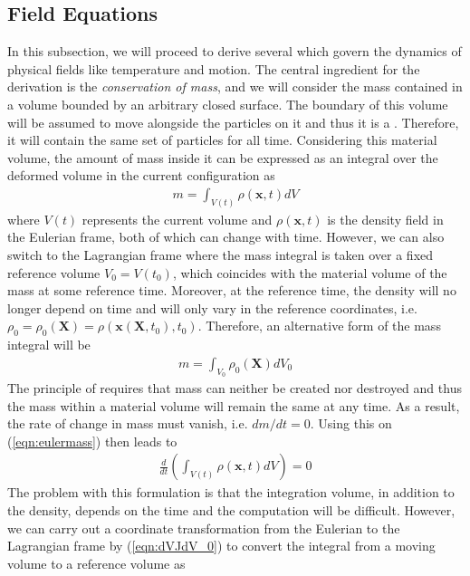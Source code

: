 \subsection{Field Equations}
In this subsection, we will proceed to derive several  which govern the dynamics of physical fields like temperature and motion. The central ingredient for the derivation is the \textit{conservation of mass}, and we will consider the mass contained in a volume bounded by an arbitrary closed surface. The boundary of this volume will be assumed to move alongside the particles on it and thus it is a . Therefore, it will contain the same set of particles for all time. Considering this material volume, the amount of mass inside it can be expressed as an integral over the deformed volume in the current configuration as
\begin{align}
m = \int_{V(t)} \rho(\textbf{x},t) dV \label{eqn:eulermass}
\end{align}
where $V(t)$ represents the current volume and $\rho(\textbf{x},t)$ is the density field in the Eulerian frame, both of which can change with time. However, we can also switch to the Lagrangian frame where the mass integral is taken over a fixed reference volume $V_0 = V(t_0)$, which coincides with the material volume of the mass at some reference time. Moreover, at the reference time, the density will no longer depend on time and will only vary in the reference coordinates, i.e.\ $\rho_0 = \rho_0(\textbf{X}) = \rho(\textbf{x}(\textbf{X},t_0), t_0)$. Therefore, an alternative form of the mass integral will be
\begin{align}
m = \int_{V_0} \rho_0(\textbf{X}) dV_0 \label{eqn:lagmass}
\end{align}
The principle of  requires that mass can neither be created nor destroyed and thus the mass within a material volume will remain the same at any time. As a result, the rate of change in mass must vanish, i.e. $dm/dt = 0$. Using this on (\ref{eqn:eulermass}) then leads to
\begin{align}
\frac{d}{dt}(\int_{V(t)} \rho(\textbf{x},t) dV) = 0
\end{align}
The problem with this formulation is that the integration volume, in addition to the density, depends on the time and the computation will be difficult. However, we can carry out a coordinate transformation from the Eulerian to the Lagrangian frame by (\ref{eqn:dVJdV_0}) to convert the integral from a moving volume to a reference volume as
